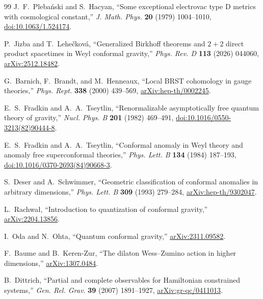 \documentclass[11pt]{article}
\begin{document}
\begin{thebibliography}{99}
J.~F.~Pleba\'nski and S.~Hacyan,
``Some exceptional electrovac type D metrics with cosmological constant,''
\emph{J. Math. Phys.} \textbf{20} (1979) 1004--1010,
\href{https://doi.org/10.1063/1.524174}{doi:10.1063/1.524174}.

P.~Jizba and T.~Lehe\v ckov\'a,
``Generalized Birkhoff theorems and $2+2$ direct product spacetimes in Weyl
conformal gravity,'' \emph{Phys. Rev. D} \textbf{113} (2026) 044060,
\href{https://arxiv.org/abs/2512.18482}{arXiv:2512.18482}.

G.~Barnich, F.~Brandt, and M.~Henneaux,
``Local BRST cohomology in gauge theories,''
\emph{Phys. Rept.} \textbf{338} (2000) 439--569,
\href{https://arxiv.org/abs/hep-th/0002245}{arXiv:hep-th/0002245}.

E.~S.~Fradkin and A.~A.~Tseytlin,
``Renormalizable asymptotically free quantum theory of gravity,''
\emph{Nucl. Phys. B} \textbf{201} (1982) 469--491,
\href{https://doi.org/10.1016/0550-3213(82)90444-8}{doi:10.1016/0550-3213(82)90444-8}.

E.~S.~Fradkin and A.~A.~Tseytlin,
``Conformal anomaly in Weyl theory and anomaly free superconformal
theories,''
\emph{Phys. Lett. B} \textbf{134} (1984) 187--193,
\href{https://doi.org/10.1016/0370-2693(84)90668-3}
{doi:10.1016/0370-2693(84)90668-3}.

S.~Deser and A.~Schwimmer,
``Geometric classification of conformal anomalies in arbitrary dimensions,''
\emph{Phys. Lett. B} \textbf{309} (1993) 279--284,
\href{https://arxiv.org/abs/hep-th/9302047}{arXiv:hep-th/9302047}.

L.~Rachwa\l,
``Introduction to quantization of conformal gravity,''
\href{https://arxiv.org/abs/2204.13856}{arXiv:2204.13856}.

I.~Oda and N.~Ohta,
``Quantum conformal gravity,''
\href{https://arxiv.org/abs/2311.09582}{arXiv:2311.09582}.

F.~Baume and B.~Keren-Zur,
``The dilaton Wess--Zumino action in higher dimensions,''
\href{https://arxiv.org/abs/1307.0484}{arXiv:1307.0484}.

B.~Dittrich,
``Partial and complete observables for Hamiltonian constrained systems,''
\emph{Gen. Rel. Grav.} \textbf{39} (2007) 1891--1927,
\href{https://arxiv.org/abs/gr-qc/0411013}{arXiv:gr-qc/0411013}.

\end{thebibliography}
\end{document}
